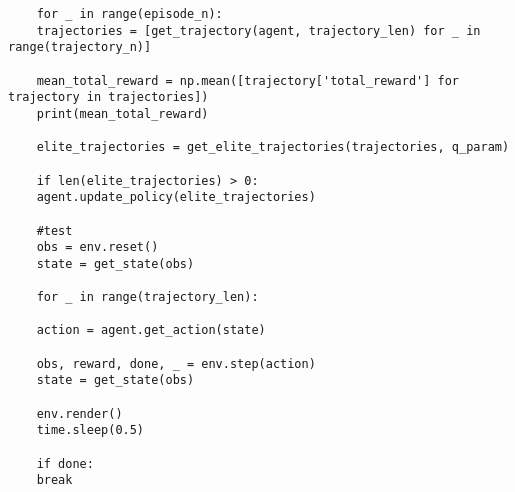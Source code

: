 \begin{lstlisting}
	for _ in range(episode_n):
	trajectories = [get_trajectory(agent, trajectory_len) for _ in range(trajectory_n)]
	
	mean_total_reward = np.mean([trajectory['total_reward'] for trajectory in trajectories])
	print(mean_total_reward)
	
	elite_trajectories = get_elite_trajectories(trajectories, q_param)
	
	if len(elite_trajectories) > 0:
	agent.update_policy(elite_trajectories)
	
	#test
	obs = env.reset()
	state = get_state(obs)
	
	for _ in range(trajectory_len):
	
	action = agent.get_action(state)
	
	obs, reward, done, _ = env.step(action)
	state = get_state(obs)
	
	env.render()
	time.sleep(0.5)
	
	if done:
	break
\end{lstlisting}